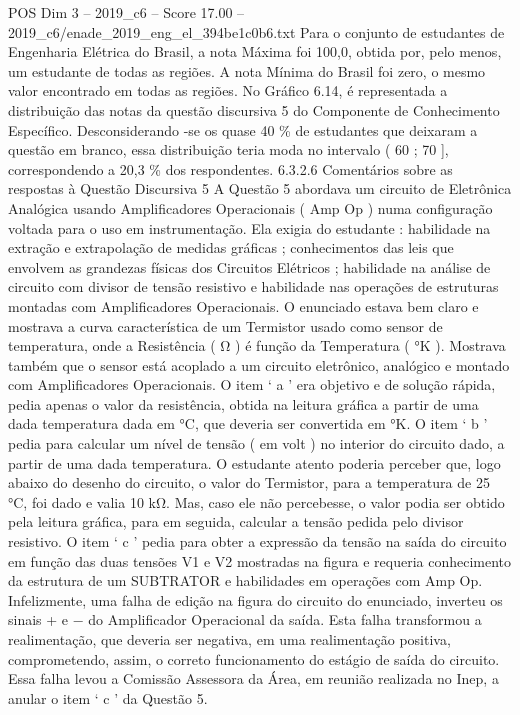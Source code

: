 \begin{textsample}{POS Dim 3 – 2019\_c6 – Score 17.00 – 2019\_c6/enade\_2019\_eng\_el\_394be1c0b6.txt}
Para o conjunto de estudantes de Engenharia Elétrica do Brasil, a nota Máxima foi 100,0, obtida por, pelo menos, um estudante de todas as regiões.
A nota Mínima do Brasil foi zero, o mesmo valor encontrado em todas as regiões.
No Gráfico 6.14, é representada a distribuição das notas da questão discursiva 5 do Componente de Conhecimento Específico.
Desconsiderando -se os quase 40 \% de estudantes que deixaram a questão em branco, essa distribuição teria moda no intervalo ( 60 ; 70 ], correspondendo a 20,3 \% dos respondentes. 6.3.2.6 Comentários sobre as respostas à Questão Discursiva 5 A Questão 5 abordava um circuito de Eletrônica Analógica usando Amplificadores Operacionais ( Amp Op ) numa configuração voltada para o uso em instrumentação.
Ela exigia do estudante : habilidade na extração e extrapolação de medidas gráficas ; conhecimentos das leis que envolvem as grandezas físicas dos Circuitos Elétricos ; habilidade na análise de circuito com divisor de tensão resistivo e habilidade nas operações de estruturas montadas com Amplificadores Operacionais.
O enunciado estava bem claro e mostrava a curva característica de um Termistor usado como sensor de temperatura, onde a Resistência ( Ω ) é função da Temperatura ( {\EmojiFont °}K ).
Mostrava também que o sensor está acoplado a um circuito eletrônico, analógico e montado com Amplificadores Operacionais.
O item ‘ a ’ era objetivo e de solução rápida, pedia apenas o valor da resistência, obtida na leitura gráfica a partir de uma dada temperatura dada em {\EmojiFont °}C, que deveria ser convertida em {\EmojiFont °}K.
O item ‘ b ’ pedia para calcular um nível de tensão ( em volt ) no interior do circuito dado, a partir de uma dada temperatura.
O estudante atento poderia perceber que, logo abaixo do desenho do circuito, o valor do Termistor, para a temperatura de 25 {\EmojiFont °}C, foi dado e valia 10 kΩ.
Mas, caso ele não percebesse, o valor podia ser obtido pela leitura gráfica, para em seguida, calcular a tensão pedida pelo divisor resistivo.
O item ‘ c ’ pedia para obter a expressão da tensão na saída do circuito em função das duas tensões V1 e V2 mostradas na figura e requeria conhecimento da estrutura de um SUBTRATOR e habilidades em operações com Amp Op.
Infelizmente, uma falha de edição na figura do circuito do enunciado, inverteu os sinais + e − do Amplificador Operacional da saída.
Esta falha transformou a realimentação, que deveria ser negativa, em uma realimentação positiva, comprometendo, assim, o correto funcionamento do estágio de saída do circuito.
Essa falha levou a Comissão Assessora da Área, em reunião realizada no Inep, a anular o item ‘ c ’ da Questão 5.

\end{textsample}

